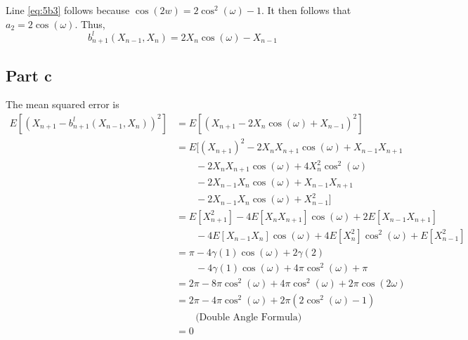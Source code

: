 \documentclass{article}
\begin{document}
Line \eqref{eq:5b3} follows because $\cos(2w) = 2 \cos^2(\omega ) - 1$.
It then follows that $a_2 = 2\cos(\omega )$.
Thus,
$$
b_{n+1}^l(X_{n - 1}, X_n) = 2 X_n \cos(\omega) - X_{n - 1}
$$

\subsection*{Part c}
The mean squared error is
\begin{align*}
  E[(X_{n + 1} - b_{n+1}^l(X_{n - 1}, X_n))^2] &= E[(X_{n + 1} - 2 X_n \cos(\omega) + X_{n - 1})^2]\\
  &= E[(X_{n + 1})^2 - 2 X_n X_{n + 1} \cos(\omega) + X_{n - 1}X_{n + 1}\\
  & \qquad -2X_n X_{n + 1} \cos(\omega) + 4 X_n^2 \cos^2(\omega)\\
  & \qquad - 2 X_{n - 1}X_n \cos(\omega) + X_{n - 1} X_{n + 1}\\
  & \qquad - 2 X_{n -1} X_n \cos(\omega) + X^2_{n - 1}
  ]\\
  &= E[X_{n + 1}^2] - 4 E[X_n X_{n + 1}] \cos(\omega) + 2 E[X_{n - 1}X_{n + 1}]\\
  & \qquad - 4 E[X_{n - 1} X_n] \cos(\omega) + 4 E[X_n^2] \cos^2(\omega) + E[X_{n - 1}^2]\\
  &= \pi - 4 \gamma(1) \cos(\omega) + 2 \gamma(2)\\
  & \qquad - 4 \gamma(1) \cos(\omega) + 4 \pi \cos^2(\omega) + \pi\\
  &= 2\pi - 8 \pi \cos^2(\omega) + 4 \pi \cos^2(\omega) + 2 \pi \cos(2\omega)\\
  &= 2\pi - 4 \pi \cos^2(\omega) + 2 \pi (2 \cos^2(\omega) - 1)\\
  & \qquad \text{(Double Angle Formula)}\\
  &= 0
\end{align*}
\end{document}
